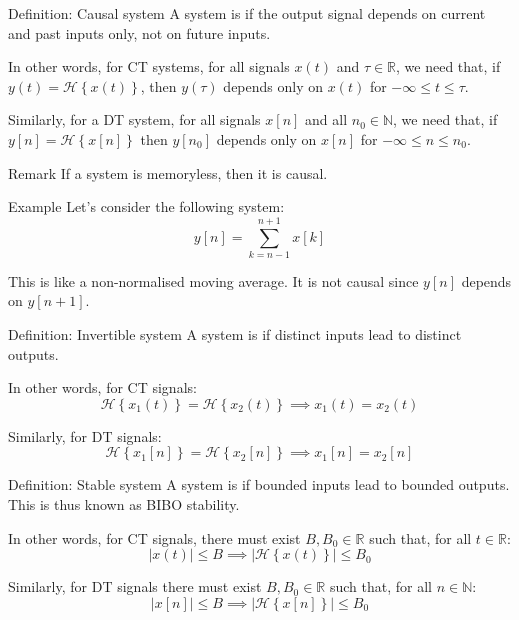 \documentclass[a4paper]{article}
\begin{document}
\begin{parag}{Definition: Causal system}
    A system is  if  the output signal depends on current and past inputs only, not on future inputs.

    In other words, for CT systems, for all signals $x\left(t\right)$ and $\tau \in \mathbb{R}$, we need that, if $y\left(t\right) = \mathcal{H}\left\{x\left(t\right)\right\}$, then $y\left(\tau\right)$ depends only on $x\left(t\right)$ for $-\infty\leq t \leq \tau$.

    Similarly, for a DT system, for all signals $x\left[n\right]$ and all $n_0 \in \mathbb{N}$, we need that, if $y\left[n\right] = \mathcal{H}\left\{x\left[n\right]\right\}$ then $y\left[n_0\right]$ depends only on $x\left[n\right]$ for $-\infty \leq n \leq n_0$.

    \begin{subparag}{Remark}
        If a system is memoryless, then it is causal.
    \end{subparag}
    
    \begin{subparag}{Example}
        Let's consider the following system: 
        \[y\left[n\right] = \sum_{k=n-1}^{n+1} x\left[k\right]\]
        
        This is like a non-normalised moving average. It is not causal since $y\left[n\right]$ depends on $y\left[n+1\right]$.
    \end{subparag}
\end{parag}

\begin{parag}{Definition: Invertible system}
    A system is  if distinct inputs lead to distinct outputs.

    In other words, for CT signals: 
    \[\mathcal{H}\left\{x_1\left(t\right)\right\} = \mathcal{H}\left\{x_2\left(t\right)\right\} \implies x_1\left(t\right) = x_2\left(t\right)\]
    
    Similarly, for DT signals: 
    \[\mathcal{H}\left\{x_1\left[n\right]\right\} = \mathcal{H}\left\{x_2\left[n\right]\right\} \implies x_1\left[n\right] = x_2\left[n\right]\]
\end{parag}

\begin{parag}{Definition: Stable system}
    A system is  if bounded inputs lead to bounded outputs. This is thus known as BIBO stability.

    In other words, for CT signals, there must exist $B, B_0 \in\mathbb{R}$ such that, for all $t \in \mathbb{R}$: 
    \[\left|x\left(t\right)\right| \leq B \implies \left|\mathcal{H}\left\{x\left(t\right)\right\}\right| \leq B_0\]

    Similarly, for DT signals there must exist $B, B_0 \in\mathbb{R}$ such that, for all $n \in \mathbb{N}$: 
    \[\left|x\left[n\right]\right| \leq B \implies \left|\mathcal{H}\left\{x\left[n\right]\right\}\right| \leq B_0\]
\end{parag}
\end{document}
